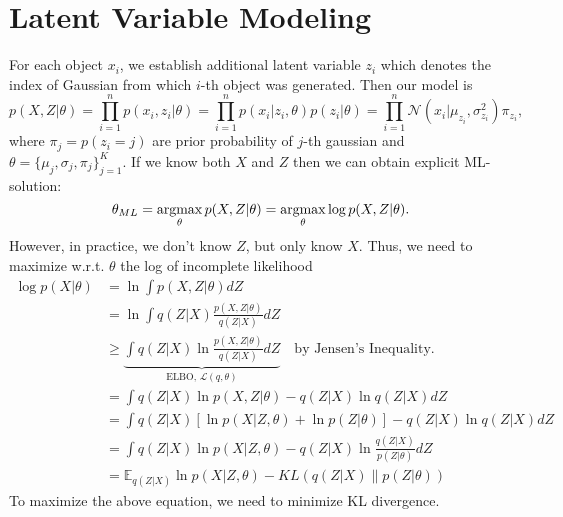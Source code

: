\section{Latent Variable Modeling}

For each object $x_i$, we establish additional latent variable $z_i$ which denotes the index of Gaussian from which $i$-th object was generated. Then our model is
$$p(X,Z|\theta) = \prod_{i=1}^{n}p(x_i,z_i|\theta) = \prod_{i=1}^{n}p(x_i|z_i,\theta)p(z_i|\theta) = \prod_{i=1}^{n}\mathcal{N}(x_i|\mu_{z_i},\sigma_{z_i}^2)\pi_{z_i},$$
where $\pi_{j} = p(z_i=j)$ are prior probability of $j$-th gaussian and $\theta = \{\mu_j, \sigma_j, \pi_j\}_{j=1}^K$. If we know both $X$ and $Z$ then we can obtain explicit ML-solution:
$$\theta_{ML} = \operatorname*{\operatorname{argmax}}_{\theta}p(X,Z|\theta) = \operatorname*{\operatorname{argmax}}_{\theta}\log p(X,Z|\theta).$$
However, in practice, we don't know $Z$, but only know $X$. Thus, we need to maximize w.r.t. $\theta$ the log of incomplete likelihood
\begin{align}
	\log p(X|\theta) & = \ln \int  p(X, Z|\theta)dZ\\
					 & = \ln\int q(Z|X) \frac{p(X, Z|\theta)}{q(Z|X)}dZ\\
					 & \geq \underbrace{\int q(Z|X) \ln\frac{p(X, Z|\theta)}{q(Z|X)}dZ}_{\text{ELBO, } \mathcal{L}(q,\theta)} \quad\textrm{by Jensen's Inequality.}\\
					 &= \int q(Z|X) \ln p(X, Z|\theta) - q(Z|X)\ln q(Z|X)dZ\\
					 &= \int q(Z|X)[\ln p(X|Z,\theta) + \ln p(Z|\theta)]  - q(Z|X)\ln q(Z|X)dZ\\
					 &= \int q(Z|X)\ln p(X|Z,\theta)  - q(Z|X)\ln\frac{q(Z|X)}{p(Z|\theta)}dZ\\
					 &= \mathbb{E}_{q(Z|X)} \ln p(X|Z,\theta)  - KL\left(q(Z|X)\|p(Z|\theta)\right) 
	\label{eq:elbo}
\end{align}
To maximize the above equation, we need to minimize KL divergence. 


